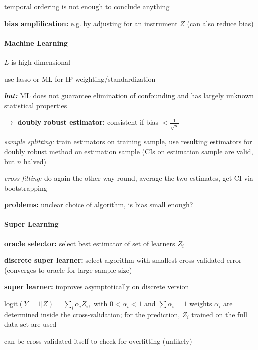 \documentclass[8pt,oneside]{extarticle}
\begin{document}
\begin{multicols}{2}
\noindent temporal ordering is not enough to conclude anything

\noindent \textbf{bias amplification:} e.g. by adjusting for an instrument $Z$ (can also reduce bias)





\paragraph{\large Machine Learning} $L$ is high-dimensional

\noindent use lasso or ML for IP weighting/standardization

\noindent \textbf{\textit{but:}} ML does not guarantee elimination of confounding and has largely unknown statistical properties

\noindent $\rightarrow$ \textbf{doubly robust estimator:} consistent if bias  $< \frac{1}{\sqrt{n}}$

\noindent \textit{sample splitting:} train estimators on training sample, use resulting estimators for doubly robust method on estimation sample (CIs on estimation sample are valid, but $n$ halved)

\noindent \textit{cross-fitting:} do again the other way round, average the two estimates, get CI via bootstrapping

\noindent \textbf{problems:} unclear choice of algorithm, is bias small enough?



\paragraph{\large Super Learning} \citep{van2007super, van2011targeted}

\noindent \textbf{oracle selector:} select best estimator of set of learners $Z_i$

\noindent \textbf{discrete super learner:} select algorithm with smallest cross-validated error (converges to oracle for large sample size)

\noindent \textbf{super learner:} improves asymptotically on discrete version

$\mathrm{logit} (Y=1|Z) = \sum_i \alpha_i Z_i, $ with $0<\alpha_i<1$ and $\sum\alpha_i=1$
weights $\alpha_i$ are determined inside the cross-validation; for the prediction, $Z_i$ trained on the full data set are used

\noindent   can be cross-validated itself to check for overfitting (unlikely)












\end{multicols}
\end{document}
